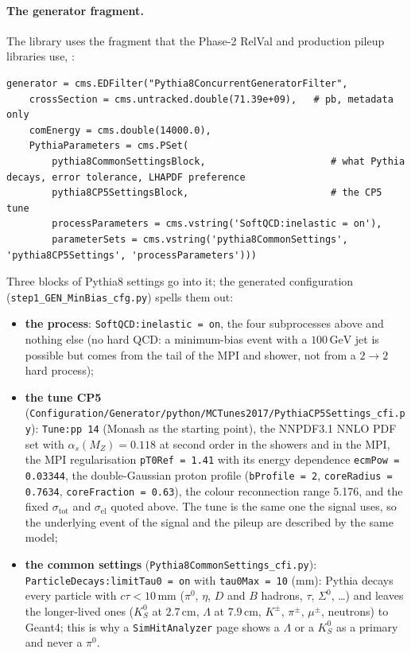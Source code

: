 \documentclass[11pt,a4paper]{article}
\newcommand{\code}[1]{\texttt{#1}}
\newcommand{\GeV}{\,\mathrm{GeV}}
\newcommand{\cm}{\,\mathrm{cm}}
\newcommand{\mm}{\,\mathrm{mm}}
\begin{document}
\paragraph{The generator fragment.} The library uses the fragment that the Phase-2 RelVal and production
pileup libraries use, :
\begin{lstlisting}[style=py]
generator = cms.EDFilter("Pythia8ConcurrentGeneratorFilter",
    crossSection = cms.untracked.double(71.39e+09),   # pb, metadata only
    comEnergy = cms.double(14000.0),
    PythiaParameters = cms.PSet(
        pythia8CommonSettingsBlock,                      # what Pythia decays, error tolerance, LHAPDF preference
        pythia8CP5SettingsBlock,                         # the CP5 tune
        processParameters = cms.vstring('SoftQCD:inelastic = on'),
        parameterSets = cms.vstring('pythia8CommonSettings', 'pythia8CP5Settings', 'processParameters')))
\end{lstlisting}
Three blocks of Pythia8 settings go into it; the generated configuration
(\code{step1\_GEN\_MinBias\_cfg.py}) spells them out:
\begin{itemize}
\item \textbf{the process}: \code{SoftQCD:inelastic = on}, the four subprocesses above and nothing else (no
  hard QCD: a minimum-bias event with a $100\GeV$ jet is possible but comes from the tail of the MPI and
  shower, not from a $2\to2$ hard process);
\item \textbf{the tune CP5} (\code{Configuration/Generator/python/MCTunes2017/PythiaCP5Settings\_cfi.py}):
  \code{Tune:pp 14} (Monash as the starting point), the NNPDF3.1 NNLO PDF set with
  $\alpha_s(M_Z)=0.118$ at second order in the showers and in the MPI, the MPI regularisation
  \code{pT0Ref = 1.41} with its energy dependence \code{ecmPow = 0.03344}, the double-Gaussian proton
  profile (\code{bProfile = 2}, \code{coreRadius = 0.7634}, \code{coreFraction = 0.63}), the colour
  reconnection range 5.176, and the fixed $\sigma_{\mathrm{tot}}$ and $\sigma_{\mathrm{el}}$ quoted above.
  The tune is the same one the signal uses, so the underlying event of the signal and the pileup are
  described by the same model;
\item \textbf{the common settings} (\code{Pythia8CommonSettings\_cfi.py}): \code{ParticleDecays:limitTau0 = on}
  with \code{tau0Max = 10} (mm): Pythia decays every particle with $c\tau<10\mm$ ($\pi^0$, $\eta$, $D$ and
  $B$ hadrons, $\tau$, $\Sigma^0$, \ldots) and leaves the longer-lived ones ($K^0_S$ at $2.7\cm$,
  $\Lambda$ at $7.9\cm$, $K^\pm$, $\pi^\pm$, $\mu^\pm$, neutrons) to Geant4; this is why a
  \code{SimHitAnalyzer} page shows a $\Lambda$ or a $K^0_S$ as a primary and never a $\pi^0$.
\end{itemize}
\end{document}
